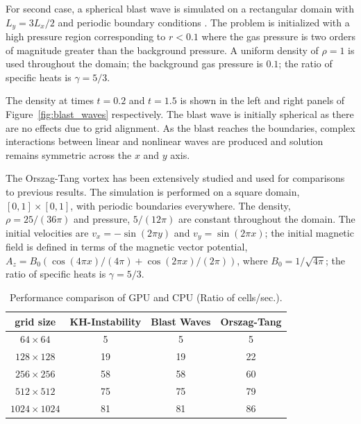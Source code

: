 For second case, a spherical blast wave is simulated on a rectangular domain with $L_y = 3L_x/2$ and periodic boundary conditions \citep{Zachary:1994,Balsara:1999,Londrillo:2000}.  The problem is initialized with a high pressure region corresponding to $r < 0.1$ where the gas pressure is two orders of magnitude greater than the background pressure.  A uniform density of $\rho = 1$ is used throughout the domain; the background gas pressure is $0.1$; the ratio of specific heats is $\gamma = 5/3$.

The density at times $t = 0.2$ and $t = 1.5$ is shown in the left and right panels of Figure~\ref{fig:blast_waves} respectively.  The blast wave is initially spherical as there are no effects due to grid alignment.  As the blast reaches the boundaries, complex interactions between linear and nonlinear waves are produced and solution remains symmetric across the $x$ and $y$ axis.  

The Orszag-Tang vortex \citep{Orszag:1979} has been extensively studied and used for comparisons to previous results.  The simulation is performed on a square domain, $[0,1] \times [0,1]$, with periodic boundaries everywhere.  The density, $\rho = 25/(36\pi)$ and pressure, $5/(12\pi)$ are constant throughout the domain.  The initial velocities are $v_x = -\sin{(2\pi y)}$ and $v_y = \sin{(2\pi x)}$; the initial magnetic field is defined in terms of the magnetic vector potential, $A_z = B_0\left(\cos{(4\pi x)}/(4\pi) + \cos{(2\pi x)}/(2\pi)\right)$, where $B_0 = 1/\sqrt{4\pi}$; the ratio  of specific heats is $\gamma = 5/3$.


\begin{table}[htbp]\figSpace
\caption{Performance comparison of GPU and CPU (Ratio of  cells/sec.). }
\begin{tabular*}{\textwidth}{@{\extracolsep{\fill}} cccc}
\\ 
\hline 
\hline 
grid size & KH-Instability & Blast Waves & Orszag-Tang \\
\hline
$64\times64$ & 5 & 5 & 5 \\
$128\times128$ & 19 & 19 & 22 \\
$256\times256$ & 58 & 58 & 60 \\
$512\times512$ & 75 & 75 & 79 \\
$1024\times1024$ & 81 & 81 & 86 \\
\hline
\end{tabular*}
\label{tab:performance}
\figSpace
\end{table}

